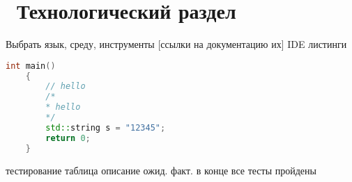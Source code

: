 \chapter{ Технологический раздел}
\label{cha:technological}
    
    Выбрать язык, среду, инструменты
    [ссылки на документацию их]
    IDE\cite{visual-studio}
    листинги

    \begin{lstlisting}[language=C++, caption=example]
    int main() 
    {
        // hello
        /*
        * hello
        */
        std::string s = "12345";
        return 0;
    }
    \end{lstlisting}

    тестирование
    таблица описание ожид. факт.
    \cite{QueryPerformanceCounter}
    в конце все тесты пройдены

\newpage